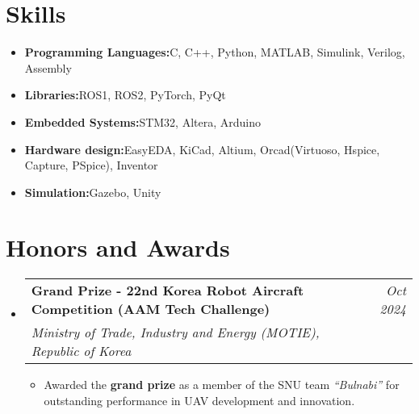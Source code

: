 \documentclass[a4paper,11pt]{article}
\makeatletter
\newcommand{\resumeItem}[2]{
  \item{
    \textbf{#1}{\hspace{0.5mm}#2 \vspace{-0.5mm}}
  }
}
\newcommand{\resumeProject}[4]{
\vspace{0.5mm}\item
    \begin{tabular*}{0.98\textwidth}[t]{l@{\extracolsep{\fill}}r}
        \textbf{#1} & \textit{\footnotesize{#3}} \\
        \footnotesize{\textit{#2}} & \footnotesize{#4}
    \end{tabular*}
    \vspace{-2.4mm}
}
\newcommand{\resumeSubItem}[2]{\resumeItem{#1}{#2}\vspace{-4pt}}
\newcommand{\resumeSubHeadingListStart}{\begin{itemize}[leftmargin=*,labelsep=1mm]}
\newcommand{\resumeHeadingSkillStart}{\begin{itemize}[leftmargin=*,itemsep=1.7mm, rightmargin=2ex]}
\newcommand{\resumeItemListStart}{\begin{itemize}[leftmargin=*,labelsep=1mm,itemsep=0.5mm]}
\newcommand{\resumeSubHeadingListEnd}{\end{itemize}\vspace{2mm}}
\newcommand{\resumeHeadingSkillEnd}{\end{itemize}\vspace{-2mm}}
\newcommand{\resumeItemListEnd}{\end{itemize}\vspace{-2mm}}
\makeatother
\begin{document}

\section{\textbf{Skills}}
\vspace{-0.4mm}
\resumeHeadingSkillStart

    \resumeSubItem{Programming Languages:}
        {C, C++, Python, MATLAB, Simulink, Verilog, Assembly}
    
    \resumeSubItem{Libraries:}
        {ROS1, ROS2, PyTorch, PyQt}
    
    \resumeSubItem{Embedded Systems:}
        {STM32, Altera, Arduino}
    
    \resumeSubItem{Hardware design:}
        {EasyEDA, KiCad, Altium, Orcad(Virtuoso, Hspice, Capture, PSpice), Inventor}
    
    \resumeSubItem{Simulation:}
        {Gazebo, Unity}

\resumeHeadingSkillEnd






\section{\textbf{Honors and Awards}}
\vspace{-0.4mm}
\resumeSubHeadingListStart

    \resumeProject
        {Grand Prize - 22nd Korea Robot Aircraft Competition (AAM Tech Challenge)}
        {Ministry of Trade, Industry and Energy (MOTIE), Republic of Korea}
        {Oct 2024}
        {{}}
        \resumeItemListStart
            \item Awarded the \textbf{grand prize} as a member of the SNU team \textit{“Bulnabi”} for outstanding performance in UAV development and innovation.
        \resumeItemListEnd

\resumeSubHeadingListEnd





\end{document}
